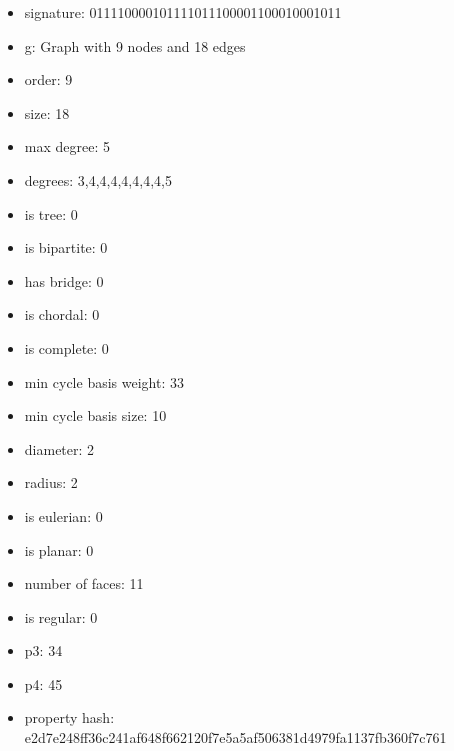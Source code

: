 \newpage
\begin{figure}
\end{figure}
\begin{itemize}
\item signature: 011110000101111011100001100010001011
\item g: Graph with 9 nodes and 18 edges
\item order: 9
\item size: 18
\item max degree: 5
\item degrees: 3,4,4,4,4,4,4,4,5
\item is tree: 0
\item is bipartite: 0
\item has bridge: 0
\item is chordal: 0
\item is complete: 0
\item min cycle basis weight: 33
\item min cycle basis size: 10
\item diameter: 2
\item radius: 2
\item is eulerian: 0
\item is planar: 0
\item number of faces: 11
\item is regular: 0
\item p3: 34
\item p4: 45
\item property hash: e2d7e248ff36c241af648f662120f7e5a5af506381d4979fa1137fb360f7c761
\end{itemize}
